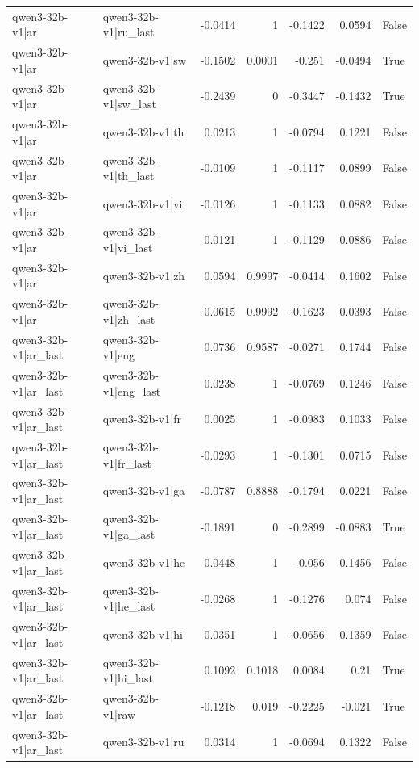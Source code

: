 \begin{table}
\begin{tabular}{l l r r r r l}
qwen3-32b-v1|ar & qwen3-32b-v1|ru_last & -0.0414 & 1 & -0.1422 & 0.0594 & False \\
qwen3-32b-v1|ar & qwen3-32b-v1|sw & -0.1502 & 0.0001 & -0.251 & -0.0494 & True \\
qwen3-32b-v1|ar & qwen3-32b-v1|sw_last & -0.2439 & 0 & -0.3447 & -0.1432 & True \\
qwen3-32b-v1|ar & qwen3-32b-v1|th & 0.0213 & 1 & -0.0794 & 0.1221 & False \\
qwen3-32b-v1|ar & qwen3-32b-v1|th_last & -0.0109 & 1 & -0.1117 & 0.0899 & False \\
qwen3-32b-v1|ar & qwen3-32b-v1|vi & -0.0126 & 1 & -0.1133 & 0.0882 & False \\
qwen3-32b-v1|ar & qwen3-32b-v1|vi_last & -0.0121 & 1 & -0.1129 & 0.0886 & False \\
qwen3-32b-v1|ar & qwen3-32b-v1|zh & 0.0594 & 0.9997 & -0.0414 & 0.1602 & False \\
qwen3-32b-v1|ar & qwen3-32b-v1|zh_last & -0.0615 & 0.9992 & -0.1623 & 0.0393 & False \\
qwen3-32b-v1|ar_last & qwen3-32b-v1|eng & 0.0736 & 0.9587 & -0.0271 & 0.1744 & False \\
qwen3-32b-v1|ar_last & qwen3-32b-v1|eng_last & 0.0238 & 1 & -0.0769 & 0.1246 & False \\
qwen3-32b-v1|ar_last & qwen3-32b-v1|fr & 0.0025 & 1 & -0.0983 & 0.1033 & False \\
qwen3-32b-v1|ar_last & qwen3-32b-v1|fr_last & -0.0293 & 1 & -0.1301 & 0.0715 & False \\
qwen3-32b-v1|ar_last & qwen3-32b-v1|ga & -0.0787 & 0.8888 & -0.1794 & 0.0221 & False \\
qwen3-32b-v1|ar_last & qwen3-32b-v1|ga_last & -0.1891 & 0 & -0.2899 & -0.0883 & True \\
qwen3-32b-v1|ar_last & qwen3-32b-v1|he & 0.0448 & 1 & -0.056 & 0.1456 & False \\
qwen3-32b-v1|ar_last & qwen3-32b-v1|he_last & -0.0268 & 1 & -0.1276 & 0.074 & False \\
qwen3-32b-v1|ar_last & qwen3-32b-v1|hi & 0.0351 & 1 & -0.0656 & 0.1359 & False \\
qwen3-32b-v1|ar_last & qwen3-32b-v1|hi_last & 0.1092 & 0.1018 & 0.0084 & 0.21 & True \\
qwen3-32b-v1|ar_last & qwen3-32b-v1|raw & -0.1218 & 0.019 & -0.2225 & -0.021 & True \\
qwen3-32b-v1|ar_last & qwen3-32b-v1|ru & 0.0314 & 1 & -0.0694 & 0.1322 & False \\

\end{tabular}
\end{table}
